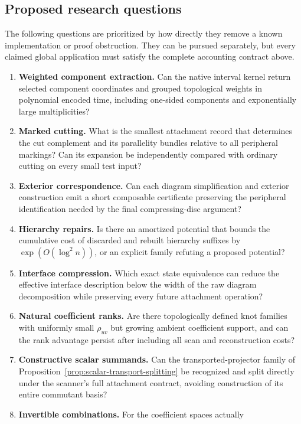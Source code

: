 \subsection{Proposed research questions}

The following questions are prioritized by how directly they remove a
known implementation or proof obstruction. They can be pursued separately,
but every claimed global application must satisfy the complete accounting
contract above.

\begin{enumerate}[label=Q\arabic*.,leftmargin=12mm]
\item \textbf{Weighted component extraction.} Can the native interval
kernel return selected component coordinates and grouped topological
weights in polynomial encoded time, including one-sided components and
exponentially large multiplicities?
\item \textbf{Marked cutting.} What is the smallest attachment record that
determines the cut complement and its parallelity bundles relative to all
peripheral markings? Can its expansion be independently compared with
ordinary cutting on every small test input?
\item \textbf{Exterior correspondence.} Can each diagram simplification and
exterior construction emit a short composable certificate preserving the
peripheral identification needed by the final compressing-disc argument?
\item \textbf{Hierarchy repairs.} Is there an amortized potential that bounds
the cumulative cost of discarded and rebuilt hierarchy suffixes by
$\exp(O(\log^2 n))$, or an explicit family refuting a proposed potential?
\item \textbf{Interface compression.} Which exact state equivalence can
reduce the effective interface description below the width of the raw
diagram decomposition while preserving every future attachment operation?
\item \textbf{Natural coefficient ranks.} Are there topologically defined
knot families with uniformly small $\rho_{uv}$ but growing ambient
coefficient support, and can the rank advantage persist after including
all scan and reconstruction costs?
\item \textbf{Constructive scalar summands.} Can the transported-projector
family of Proposition~\ref{prop:scalar-transport-splitting} be recognized
and split directly under the scanner's full attachment contract, avoiding
construction of its entire commutant basis?
\item \textbf{Invertible combinations.} For the coefficient spaces actually

\end{enumerate}
